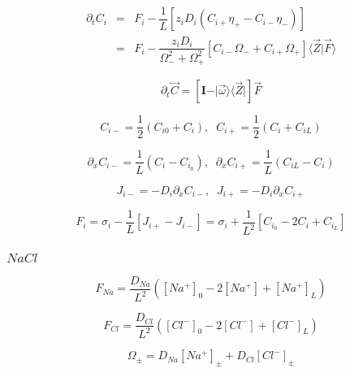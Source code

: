 \documentclass[aps,12pt]{revtex4}
\begin{document}
\begin{equation}
\begin{array}{rcl}
\partial_t C_i & = & F_i 
- \dfrac{1}{L}  \left[ z_i D_i (C_{i+} \eta_+ - C_{i-} \eta_-) \right] \\
& = & F_i - \dfrac{z_i D_i }{ \Omega_{-}^2 + \Omega_{+}^2 } \left[ C_{i-} \Omega_{-} + C_{i+} \Omega_{+} \right] \langle \vec Z \vert \vec F \rangle
\end{array}
\end{equation}

\begin{equation}
	\partial_t \vec C = \left[ \bm{I} - \vert \vec \omega \rangle \langle \vec Z \vert \right] \vec F
\end{equation}

\begin{equation}
	C_{i-} = \dfrac{1}{2}(C_{i0}+C_i),\;\;C_{i+} = \dfrac{1}{2}(C_i+C_{iL})
\end{equation}

\begin{equation}
	\partial_x C_{i-} = \dfrac{1}{L}(C_i-C_{i_0}),\;\; \partial_x C_{i+} =  \dfrac{1}{L}(C_{iL}-C_{i})
\end{equation}

\begin{equation}
	J_{i-} = -D_i \partial_x C_{i-} ,\;\; J_{i+} = -D_i \partial_x C_{i+}  
\end{equation}

\begin{equation}
	F_i = \sigma_i -\dfrac{1}{L}\left[ J_{i+} - J_{i-} \right] = \sigma_i + \dfrac{1}{L^2}\left[C_{i_0}-2 C_i + C_{i_L}\right]
\end{equation}

\subsubsection{$NaCl$}
 	$$
		F_{Na} = \dfrac{D_{Na}}{L^2}\left( [Na^+]_0 - 2[Na^+] + [Na^+]_L\right)
	$$
	
	$$
		F_{Cl} = \dfrac{D_{Cl}}{L^2}\left( [Cl^-]_0 - 2[Cl^-] + [Cl^-]_L\right)
	$$
	
	$$
		\Omega_{\pm} = D_{Na}  [Na^+]_\pm + D_{Cl}  [Cl^-]_\pm
	$$
\end{document}
